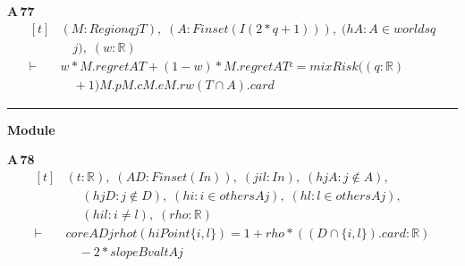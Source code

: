 \noindent\textbf{A\,77}\quad{}
{\footnotesize\[ \begin{aligned}[t]
&(\mathit{M} : \mathit{Region} \mathit{q} \mathit{j} \mathit{T}),\; (\mathit{A} : \mathit{Finset} (\mathit{I} (2*\mathit{q}+1))),\; (\mathit{hA} : \mathit{A} \in \mathit{worlds} \mathit{q}\\
&\quad \mathit{j}),\; (\mathit{w} : \mathbb{R} )\\
\vdash\;&\mathit{w}*\mathit{M}.\mathit{regret} \mathit{A} \mathit{T}+(1-\mathit{w})*\mathit{M}.\mathit{regret} \mathit{A} \mathit{Tᶜ} = \mathit{mixRisk} ((\mathit{q}:\mathbb{R} )\\
&\quad +1) \mathit{M}.\mathit{p} \mathit{M}.\mathit{c} \mathit{M}.\mathit{e} \mathit{M}.\mathit{r} \mathit{w} (\mathit{T} \cap \mathit{A}).\mathit{card}
\end{aligned} \]}

\vspace{4pt}\noindent\rule{\columnwidth}{0.4pt}\par\vspace{2pt}
\noindent\textbf{Module }\par\vspace{3pt}

\noindent\textbf{A\,78}\quad{}
{\footnotesize\[ \begin{aligned}[t]
&(\mathit{t} : \mathbb{R} ),\; (\mathit{A} \mathit{D} : \mathit{Finset} (\mathit{I} \mathit{n})),\; (\mathit{j} \mathit{i} \mathit{l} : \mathit{I} \mathit{n}),\; (\mathit{hjA} : \mathit{j} \notin \mathit{A}),\\
&\quad \; (\mathit{hjD} : \mathit{j} \notin \mathit{D}),\; (\mathit{hi} : \mathit{i} \in \mathit{others} \mathit{A} \mathit{j}),\; (\mathit{hl} : \mathit{l} \in \mathit{others} \mathit{A} \mathit{j}),\\
&\quad \; (\mathit{hil} : \mathit{i} \neq \mathit{l}),\; (\mathit{rho} : \mathbb{R} )\\
\vdash\;&\mathit{core} \mathit{A} \mathit{D} \mathit{j} \mathit{rho} \mathit{t} (\mathit{hiPoint} \{ \mathit{i},\mathit{l}\} ) = 1+\mathit{rho}*((\mathit{D} \cap \{ \mathit{i},\mathit{l}\} ).\mathit{card}:\mathbb{R} )\\
&\quad -2*\mathit{slopeBval} \mathit{t} \mathit{A} \mathit{j}
\end{aligned} \]}

